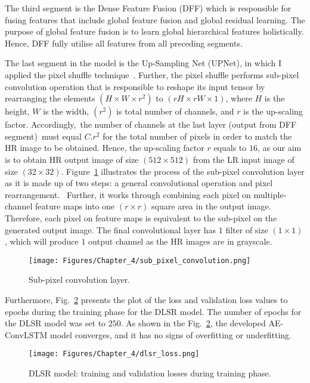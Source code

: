The third segment is the Dense Feature Fusion (DFF) which is responsible for fusing features that include global feature fusion and global residual learning.
The purpose of global feature fusion is to learn global hierarchical features holistically.
Hence, DFF fully utilise all features from all preceding segments.

The last segment in the model is the Up-Sampling Net (UPNet), in which I applied the pixel shuffle technique~\cite{Shi2016}.
Further, the pixel shuffle performs sub-pixel convolution operation that is responsible to reshape its input tensor by rearranging the elements \((H\times W\times r^2)\) to \((rH\times rW\times 1)\), where \(H\) is the height, \(W\) is the width, \((r^2)\) is total number of channels, and \(r\) is the up-scaling factor.
Accordingly, the number of channels at the last layer (output from DFF segment) must equal \(C.r^2\) for the total number of pixels in order to match the HR image to be obtained.
Hence, the up-scaling factor \(r\) equals to \(16\), as our aim is to obtain HR output image of size \((512\times 512)\) from the LR input image of size \((32\times 32)\).
Figure~\ref{fig:sub_pixel_layer} illustrates the process of the sub-pixel convolution layer as it is made up of two steps: a general convolutional operation and pixel rearrangement. 
Further, it works through combining each pixel on multiple-channel feature maps into one \((r\times r)\) square area in the output image. 
Therefore, each pixel on feature maps is equivalent to the sub-pixel on the generated output image.
The final convolutional layer has \(1\) filter of size \((1\times 1)\), which will produce \(1\) output channel as the HR images are in grayscale. 
\begin{figure} [h!]
	\begin{center}
		\texttt{[image: Figures/Chapter\_4/sub\_pixel\_convolution.png]}
	\end{center}
	\caption{Sub-pixel convolution layer.} 
	\label{fig:sub_pixel_layer}
\end{figure}


Furthermore, Fig.~\ref{fig:dlsr_loss} presents the plot of the loss and validation loss values to epochs during the training phase for the DLSR model.
The number of epochs for the DLSR model was set to $250$.
As shown in the Fig.~\ref{fig:dlsr_loss}, the developed AE-ConvLSTM model converges, and it has no signs of overfitting or underfitting.
\begin{figure} [h!]
	\begin{center}
		\texttt{[image: Figures/Chapter\_4/dlsr\_loss.png]}
	\end{center}
	\caption{DLSR model: training and validation losses during training phase.} 
	\label{fig:dlsr_loss}
\end{figure}
